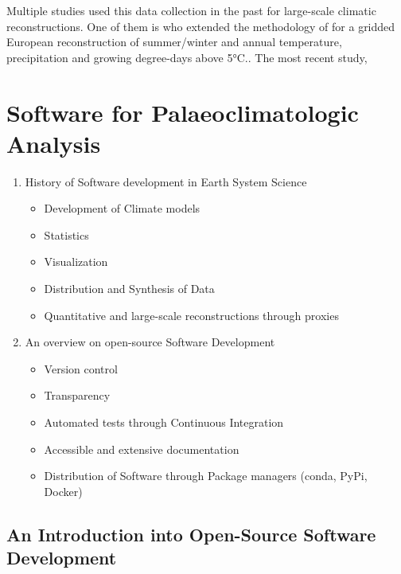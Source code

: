\begin{refsection}
Multiple studies used this data collection in the past for large-scale climatic reconstructions. One of them is \cite{MauriDavisCollinsEtAl2015} who extended the methodology of \cite{DavisBrewerStevensonEtAl2003} for a gridded European reconstruction of summer/winter and annual temperature, precipitation and growing degree-days above 5°C.. The most recent study, \cite{MarsicekShumanBartleinEtAl2018} 


\section{Software for Palaeoclimatologic Analysis} \label{sec:intro-software}

\begin{enumerate}
	\item History of Software development in Earth System Science
	\begin{itemize}
		\item Development of Climate models
		\item Statistics
		\item Visualization
		\item Distribution and Synthesis of Data
		\item Quantitative and large-scale reconstructions through proxies
	\end{itemize}
	\item An overview on open-source Software Development
	\begin{itemize}
		\item
		Version control
		\item
		Transparency
		\item
		Automated tests through Continuous Integration
		\item
		Accessible and extensive documentation
		\item
		Distribution of Software through Package managers (conda, PyPi,
		Docker)
	\end{itemize}
\end{enumerate}

\subsection{An Introduction into Open-Source Software Development} \label{sec:intro-software-tools}


\end{refsection}
